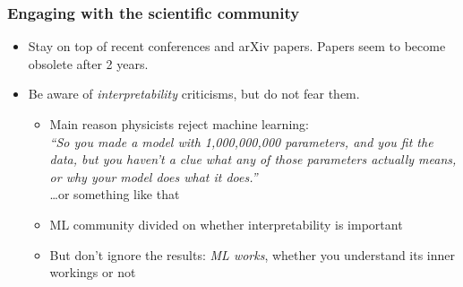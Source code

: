 \begin{frame}
    \frametitle{Engaging with the scientific community}

    \begin{itemize}
        \item<+-> \alert{Stay on top of recent conferences and arXiv papers.}
        Papers seem to become obsolete after 2 years.
        \item<+-> \alert{Be aware of \emph{interpretability} criticisms, but do not fear them.}
        \begin{itemize}
            \item Main reason physicists reject machine learning: \\[1ex]

            \emph{``So you made a model with 1,000,000,000 parameters, and you fit the data, but you haven't a clue what any of those parameters actually means, or why your model does what it does.''} \\[1ex]

            \ldots or something like that
            \item ML community divided on whether interpretability is important
            \item But don't ignore the results: \emph{ML works}, whether you understand its inner workings or not
        \end{itemize}
    \end{itemize}
\end{frame}

